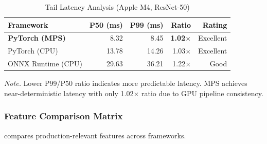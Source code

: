 \documentclass[10pt,twocolumn,a4paper]{article}
\theoremstyle{definition}
\theoremstyle{plain}
\begin{document}
\begin{table}[t]
\centering
\caption{Tail Latency Analysis (Apple M4, ResNet-50)}
\label{tab:tail_latency}
\scriptsize
\setlength{\tabcolsep}{4pt}
\begin{tabular}{@{}lrrrr@{}}
\toprule
\textbf{Framework} & \textbf{P50 (ms)} & \textbf{P99 (ms)} & \textbf{Ratio} & \textbf{Rating} \\
\midrule
\textbf{PyTorch (MPS)} & 8.32 & 8.45 & \textbf{1.02$\times$} & Excellent \\
PyTorch (CPU) & 13.78 & 14.26 & 1.03$\times$ & Excellent \\
ONNX Runtime (CPU) & 29.63 & 36.21 & 1.22$\times$ & Good \\
\bottomrule
\end{tabular}

\vspace{0.5em}
\noindent\textit{Note.} Lower P99/P50 ratio indicates more predictable latency. MPS achieves near-deterministic latency with only 1.02$\times$ ratio due to GPU pipeline consistency.
\end{table}

\subsubsection{Feature Comparison Matrix}

 compares production-relevant features across frameworks.
\end{document}

